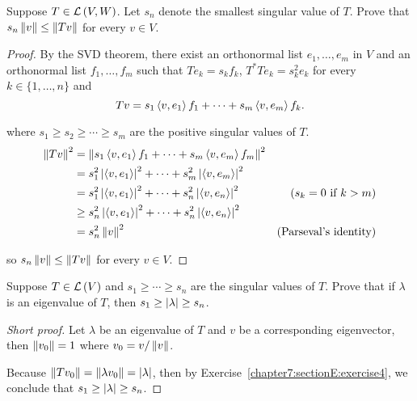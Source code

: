 \begin{exercise}\label{chapter7:sectionE:exercise14}
    Suppose $T\in\mathcal{L}\left({V, W}\right)$. Let $s_{n}$ denote the smallest singular value of $T$. Prove that $s_{n}\left\Vert{v}\right\Vert\leq \left\Vert{Tv}\right\Vert$ for every $v\in V$.
\end{exercise}

\begin{proof}
    By the SVD theorem, there exist an orthonormal list $e_{1}, \ldots, e_{m}$ in $V$ and an orthonormal list $f_{1}, \ldots, f_{m}$ such that $Te_{k} = s_{k}f_{k}$, $T^{*}Te_{k} = s_{k}^{2}e_{k}$ for every $k\in\{1,\ldots,n\}$ and
    \[
        Tv = s_{1}\left\langle{v,e_{1}}\right\rangle f_{1} + \cdots + s_{m}\left\langle{v,e_{m}}\right\rangle f_{k}.
    \]

    where $s_{1}\geq s_{2}\geq \cdots \geq s_{m}$ are the positive singular values of $T$.
    \begin{align*}
        \left\Vert{Tv}\right\Vert^{2} & = \left\Vert{s_{1}\left\langle{v,e_{1}}\right\rangle f_{1} + \cdots + s_{m}\left\langle{v,e_{m}}\right\rangle f_{m}}\right\Vert^{2}                                              \\
                      & = s_{1}^{2}\left\vert{\left\langle{v, e_{1}}\right\rangle}\right\vert^{2} + \cdots + s_{m}^{2}\left\vert{\left\langle{v, e_{m}}\right\rangle}\right\vert^{2}                                     \\
                      & = s_{1}^{2}\left\vert{\left\langle{v, e_{1}}\right\rangle}\right\vert^{2} + \cdots + s_{n}^{2}\left\vert{\left\langle{v, e_{n}}\right\rangle}\right\vert^{2}   & \text{($s_{k} = 0$ if $k > m$)} \\
                      & \geq s_{n}^{2}\left\vert{\left\langle{v, e_{1}}\right\rangle}\right\vert^{2} + \cdots + s_{n}^{2}\left\vert{\left\langle{v,e_{n}}\right\rangle}\right\vert^{2}                                   \\
                      & = s_{n}^{2}\left\Vert{v}\right\Vert^{2}                                                                        & \text{(Parseval's identity)}
    \end{align*}

    so $s_{n}\left\Vert{v}\right\Vert\leq \left\Vert{Tv}\right\Vert$ for every $v\in V$.
\end{proof}
\newpage

\begin{exercise}\label{chapter7:sectionE:exercise15}
    Suppose $T\in\mathcal{L}\left({V}\right)$ and $s_{1}\geq \cdots\geq s_{n}$ are the singular values of $T$. Prove that if $\lambda$ is an eigenvalue of $T$, then $s_{1}\geq \left\vert{\lambda}\right\vert\geq s_{n}$.
\end{exercise}

\begin{proof}[Short proof]
    Let $\lambda$ be an eigenvalue of $T$ and $v$ be a corresponding eigenvector, then $\left\Vert{v_{0}}\right\Vert = 1$ where $v_{0} = v/\left\Vert{v}\right\Vert$.

    Because $\left\Vert{Tv_{0}}\right\Vert = \left\Vert{\lambda v_{0}}\right\Vert = \left\vert{\lambda}\right\vert$, then by Exercise~\ref{chapter7:sectionE:exercise4}, we conclude that $s_{1}\geq \left\vert{\lambda}\right\vert\geq s_{n}$.
\end{proof}


